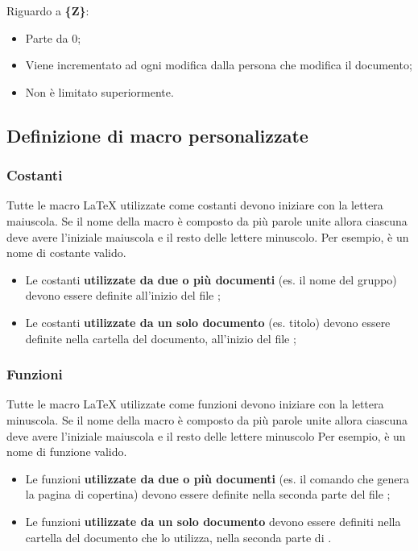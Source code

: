 Riguardo a \textbf{\{Z\}}:
\begin{itemize}
 \item Parte da 0;
 \item Viene incrementato ad ogni modifica dalla persona che modifica il documento;
 \item Non è limitato superiormente.
\end{itemize}


\subsection{Definizione di macro personalizzate}

\subsubsection{Costanti}

Tutte le macro \LaTeX{} utilizzate come costanti devono iniziare con la lettera maiuscola. Se il nome della macro è composto da più parole unite allora ciascuna deve avere l'iniziale maiuscola e il resto delle lettere minuscolo. Per esempio,  è un nome di costante valido.

\begin{itemize}
	\item Le costanti \textbf{utilizzate da due o più documenti} (es. il nome del gruppo) devono essere definite all'inizio del file ;
	
	\item Le costanti \textbf{utilizzate da un solo documento} (es. titolo) devono essere definite nella cartella del documento, all'inizio del file ;
\end{itemize}
	
\subsubsection{Funzioni}

Tutte le macro \LaTeX{} utilizzate come funzioni devono iniziare con la lettera minuscola. Se il nome della macro è composto da più parole unite allora ciascuna deve avere l'iniziale maiuscola e il resto delle lettere minuscolo Per esempio,  è un nome di funzione valido.

\begin{itemize}
	\item Le funzioni \textbf{utilizzate da due o più documenti} (es. il comando che genera la pagina di copertina) devono essere definite nella seconda parte del file ;
	
	\item Le funzioni \textbf{utilizzate da un solo documento} devono essere definiti nella cartella del documento che lo utilizza, nella seconda parte di .
\end{itemize}

